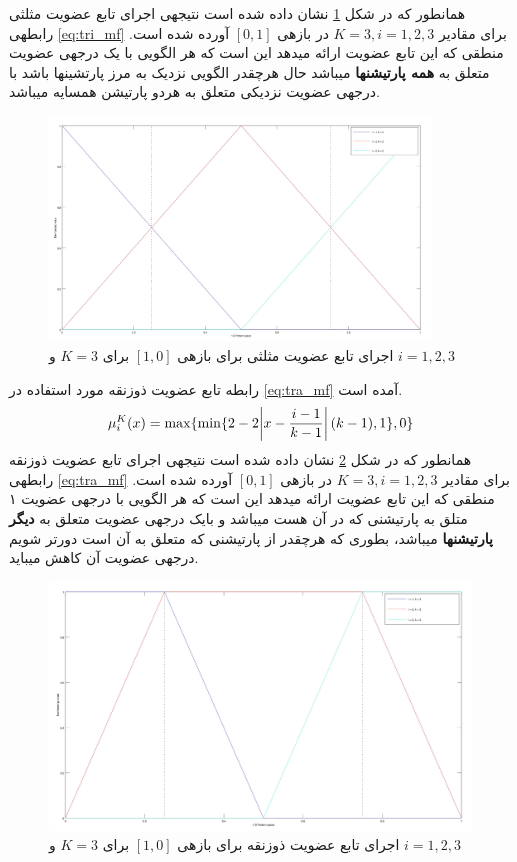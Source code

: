 \documentclass[10pt,a4paper]{article}
\newcommand{\نیمفاصله}{\halfspace}
\renewcommand{\ }{\halfspace}
\begin{document}
 همانطور که در شکل
\ref{fig:tri_mf_K3}
نشان داده شده است نتیجه\ ی اجرای تابع عضویت مثلثی رابطه\ ی
\ref{eq:tri_mf}
برای مقادیر
$K = 3, i = 1, 2, 3$
در بازه\ ی
$[0, 1]$
آورده شده است. منطقی که این تابع عضویت ارائه میدهد این است که هر الگویی با یک درجه\ ی عضویت متعلق به \textbf{همه پارتیشن\ ها} می\ باشد حال هرچقدر الگویی نزدیک به مرز پارتشین\ ها باشد با درجه\ ی عضویت نزدیکی متعلق به هردو پارتیشن همسایه می\ باشد.
\begin{figure}[H]
    \centering
    \includegraphics[width=0.9\textwidth]{tri_mf_K3}
    \caption{\small اجرای تابع عضویت مثلثی برای بازه\ ی $[1, 0]$ برای $K = 3$ و $i = 1, 2, 3$}
    \label{fig:tri_mf_K3}
\end{figure}
رابطه تابع عضویت ذوزنقه مورد استفاده در
\ref{eq:tra_mf}
آمده است.
\begin{equation}
    \mu_i^K(x) = \max\{\min\{2 - 2\abs{x - \frac{i - 1}{k - 1}} (k - 1), 1\}, 0\}
    \label{eq:tra_mf}
\end{equation}
 همانطور که در شکل
\ref{fig:tra_mf_K3}
نشان داده شده است نتیجه\ ی اجرای تابع عضویت ذوزنقه رابطه\ ی
\ref{eq:tra_mf}
برای مقادیر
$K = 3, i = 1, 2, 3$
در بازه\ ی
$[0, 1]$
آورده شده است. منطقی که این تابع عضویت ارائه میدهد این است که هر الگویی با درجه\ ی عضویت ۱ متلق به پارتیشنی که در آن هست می\ باشد و بایک درجه\ ی عضویت متعلق به \textbf{دیگر پارتیشن\ ها} می\ باشد، بطوری که هرچقدر از پارتیشنی که متعلق به آن است دورتر شویم درجه\ ی عضویت آن کاهش می\ باید.
\begin{figure}[H]
    \centering
    \includegraphics[width=1\textwidth]{tra_mf_K3}
    \caption{\small اجرای تابع عضویت ذوزنقه برای بازه\ ی $[1, 0]$ برای $K = 3$ و $i = 1, 2, 3$}
    \label{fig:tra_mf_K3}
\end{figure}
\end{document}
